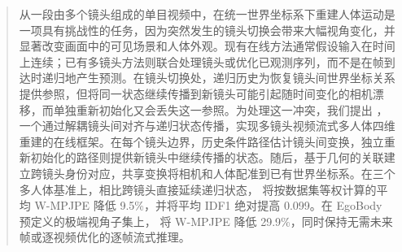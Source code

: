 \begin{abstract}
从一段由多个镜头组成的单目视频中，在统一世界坐标系下重建人体运动是一项具有挑战性的任务，因为突然发生的镜头切换会带来大幅视角变化，并显著改变画面中的可见场景和人体外观。现有在线方法通常假设输入在时间上连续；已有多镜头方法则联合处理镜头或优化已观测序列，而不是在帧到达时递归地产生预测。在镜头切换处，递归历史为恢复镜头间世界坐标关系提供参照，但将同一状态继续传播到新镜头可能引起随时间变化的相机漂移，而单独重新初始化又会丢失这一参照。为处理这一冲突，我们提出 \method{}，一个通过解耦镜头间对齐与递归状态传播，实现多镜头视频流式多人体四维重建的在线框架。在每个镜头边界，历史条件路径估计镜头间变换，独立重新初始化的路径则提供新镜头中继续传播的状态。随后，基于几何的关联建立跨镜头身份对应，共享变换将相机和人体配准到已有世界坐标系。在三个多人体基准上，相比跨镜头直接延续递归状态，\method{} 将按数据集等权计算的平均 W-MPJPE 降低 9.5\%，并将平均 IDF1 绝对提高 0.099。在 EgoBody 预定义的极端视角子集上，\method{} 将 W-MPJPE 降低 29.9\%，同时保持无需未来帧或逐视频优化的逐帧流式推理。
\end{abstract}
